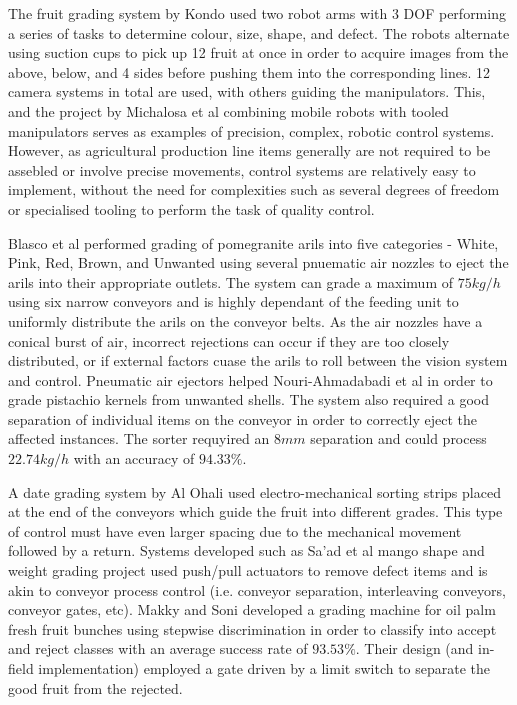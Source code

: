 \documentclass[fleqn,twoside]{article}
\begin{document}
The fruit grading system by Kondo \cite{kondo} used two robot arms with 3 DOF performing a series of tasks to determine colour, size, shape, and defect. The robots alternate using suction cups to pick up 12 fruit at once in order to acquire images from the above, below, and 4 sides before pushing them into the corresponding lines. 12 camera systems in total are used, with others guiding the manipulators. This, and the project by Michalosa et al \cite{michalosa} combining mobile robots with tooled manipulators serves as examples of precision, complex, robotic control systems. However, as agricultural production line items generally are not required to be assebled or involve precise movements, control systems are relatively easy to implement, without the need for complexities such as several degrees of freedom or specialised tooling to perform the task of quality control.  

Blasco et al \cite{blasco} performed grading of pomegranite arils into five categories - White, Pink, Red, Brown, and Unwanted using several pnuematic air nozzles to eject the arils into their appropriate outlets. The system can grade a maximum of $75kg/h$ using six narrow conveyors and is highly dependant of the feeding unit to uniformly distribute the arils on the conveyor belts. As the air nozzles have a conical burst of air, incorrect rejections can occur if they are too closely distributed, or if external factors cuase the arils to roll between the vision system and control. Pneumatic air ejectors helped Nouri-Ahmadabadi et al \cite{nouri-ahmadabadi} in order to grade pistachio kernels from unwanted shells. The system also required a good separation of individual items on the conveyor in order to correctly eject the affected instances. The sorter requyired an $8mm$ separation and could process $22.74kg/h$ with an accuracy of $94.33\%$. 

A date grading system by Al Ohali \cite{ohali} used electro-mechanical sorting strips placed at the end of the conveyors which guide the fruit into different grades. This type of control must have even larger spacing due to the mechanical movement followed by a return. Systems developed such as Sa'ad et al \cite{saad} mango shape and weight grading project used push/pull actuators to remove defect items and is akin to conveyor process control (i.e. conveyor separation, interleaving conveyors, conveyor gates, etc). Makky and Soni \cite{makky} developed a grading machine for oil palm fresh fruit bunches using stepwise discrimination in order to classify into accept and reject classes with an average success rate of $93.53\%$. Their design (and in-field implementation) employed a gate driven by a limit switch to separate the good fruit from the rejected.
\end{document}
